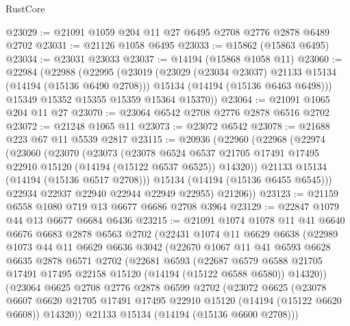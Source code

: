 \begin{lexlean}{RustCore}
\begin{coremodule}
@23029 := @21091 @1059 @204 @11 @27 @6495 @2708 @2776 @2878 @6489 @2702
@23031 := @21126 @1058 @6495
@23033 := @15862 (@15863 @6495)
@23034 := @23031 @23033
@23037 := @14194 (@15868 @1058 @11)
@23060 := @22984
    (@22988
      (@22995
        (@23019
          (@23029 (@23034 @23037) @21133 @15134 (@14194 (@15136 @6490 @2708)))
          @15134
          (@14194 (@15136 @6463 @6498)))
        @15349
        @15352
        @15355
        @15359
        @15364
        @15370))
@23064 := @21091 @1065 @204 @11 @27
@23070 := @23064 @6542 @2708 @2776 @2878 @6516 @2702
@23072 := @21248 @1065 @11
@23073 := @23072 @6542
@23078 := @21688 @223 @67 @11 @5539 @2817
@23115 := @20936
    (@22960
      (@22968
        (@22974
          (@23060
            (@23070
              (@23073
                (@23078
                  @6524
                  @6537
                  @21705
                  @17491
                  @17495
                  @22910
                  @15120
                  (@14194 (@15122 @6537 @6525))
                  @14320))
              @21133
              @15134
              (@14194 (@15136 @6517 @2708)))
            @15134
            (@14194 (@15136 @6455 @6545)))
          @22934
          @22937
          @22940
          @22944
          @22949
          @22955)
        @21206))
@23123 := @21159 @6558 @1080 @719 @13 @6677 @6686 @2708 @3964
@23129 := @22847 @1079 @44 @13 @6677 @6684 @6436
@23215 := @21091
    @1074
    @1078
    @11
    @41
    @6640
    @6676
    @6683
    @2878
    @6563
    @2702
    (@22431
      @1074
      @11
      @6629
      @6638
      (@22989
        @1073
        @44
        @11
        @6629
        @6636
        @3042
        (@22670
          @1067
          @11
          @41
          @6593
          @6628
          @6635
          @2878
          @6571
          @2702
          (@22681
            @6593
            (@22687
              @6579
              @6588
              @21705
              @17491
              @17495
              @22158
              @15120
              (@14194 (@15122 @6588 @6580))
              @14320))
          (@23064
            @6625
            @2708
            @2776
            @2878
            @6599
            @2702
            (@23072
              @6625
              (@23078
                @6607
                @6620
                @21705
                @17491
                @17495
                @22910
                @15120
                (@14194 (@15122 @6620 @6608))
                @14320))
            @21133
            @15134
            (@14194 (@15136 @6600 @2708)))

\end{coremodule}
\end{lexlean}

